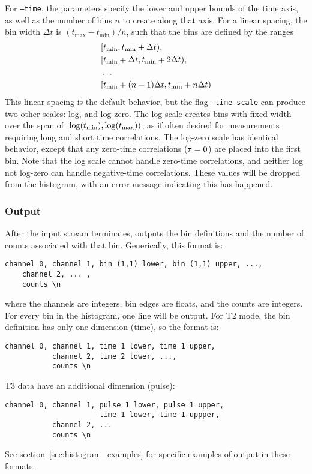 For \texttt{--time}, the parameters specify the lower and upper bounds of the time axis, as well as the number of bins $n$ to create along that axis. For a linear spacing, the bin width $\Delta t$ is $(t_{\max}-t_{\min})/n$, such that the bins are defined by the ranges
\begin{equation}
\begin{aligned}
&[t_{\min},t_{\min}+\Delta t),\\
&[t_{\min}+\Delta t,t_{\min}+2\Delta t),\\
&\ldots\\
&[t_{\min}+(n-1)\Delta t,t_{\min}+n\Delta t)
\end{aligned}
\end{equation}
This linear spacing is the default behavior, but the flag \texttt{--time-scale} can produce two other scales: log, and log-zero. The log scale creates bins with fixed width over the span of $[\log(t_{\min}),\log(t_{\max}))$, as if often desired for measurements requiring long and short time correlations. The log-zero scale has identical behavior, except that any zero-time correlations ($\tau=0$) are placed into the first bin. Note that the log scale cannot handle zero-time correlations, and neither log not log-zero can handle negative-time correlations. These values will be dropped from the histogram, with an error message indicating this has happened.

\subsubsection{Output}
After the input stream terminates,  outputs the bin definitions and the number of counts associated with that bin. Generically, this format is:
\begin{verbatim}
channel 0, channel 1, bin (1,1) lower, bin (1,1) upper, ...,
    channel 2, ... , 
    counts \n
\end{verbatim}
where the channels are integers, bin edges are floats, and the counts are integers. For every bin in the histogram, one line will be output. For T2 mode, the bin definition has only one dimension (time), so the format is:
\begin{verbatim}
channel 0, channel 1, time 1 lower, time 1 upper, 
           channel 2, time 2 lower, ...,
           counts \n
\end{verbatim}
T3 data have an additional dimension (pulse):
\begin{verbatim}
channel 0, channel 1, pulse 1 lower, pulse 1 upper,
                      time 1 lower, time 1 uppper,
           channel 2, ...
           counts \n
\end{verbatim}
See section~\ref{sec:histogram_examples} for specific examples of output in these formats.



